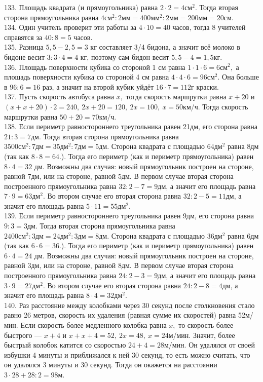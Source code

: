 133. Площадь квадрата (и прямоугольника) равна $2\cdot2=4\text{см}^2.$ Тогда вторая сторона прямоугольника равна $4\text{см}^2:2\text{мм}=400\text{мм}^2:2\text{мм}=
200\text{мм}=20$см.\\
134. Один учитель проверит эти работы за $4\cdot10=40$ часов, тогда 8 учителей справятся за $40:8=5$ часов.\\
135. Разница $5,5-2,5=3$ кг составляет 3/4 бидона, а значит всё молоко в бидоне весит $3:3\cdot4=4$ кг, поэтому сам бидон весит $5,5-4=1,5$кг.\\
136. Площадь поверхности кубика со стороной 1 см равна $1\cdot1\cdot6=6\text{см}^2,$ а площадь поверхности кубика со стороной 4 см равна $4\cdot4\cdot6=96\text{см}^2.$ Она больше в $96:6=16$ раз, а значит на второй кубик уйдёт $16\cdot7=112$г краски.\\
137. Пусть скорость автобуса равна $x,$ тогда скорость маршрутки равна $x+20$ и $(x+x+20)\cdot2=240,\ 2x+20=120,\ 2x=100,\ x=50$км/ч. Тогда скорость маршрутки равна $50+20=70$км/ч.\\
138. Если периметр равностороннего треугольника равен 21дм, его сторона равна $21:3=7\text{дм}.$ Тогда вторая сторона прямоугольника равна $3500\text{см}^2:7\text{дм}=35\text{дм}^2:7\text{дм}=5\text{дм}$. Сторона квадрата с площадью $64\text{дм}^2$ равна 8дм (так как $8\cdot8=64.$). Тогда его периметр (как и периметр прямоугольника) равен $8\cdot4=32$ дм. Возможны два случая: новый прямоугольник построен на стороне, равной 7дм, или на стороне, равной 5дм. В первом случае вторая сторона построенного прямоугольника равна $32:2-7=9$дм, а значит его площадь равна $7\cdot9=63\text{дм}^2.$ Во втором случае его вторая сторона равна $32:2-5=11$дм, а значит его площадь равна $5\cdot11=55\text{дм}^2.$\\
139. Если периметр равностороннего треугольника равен 9дм, его сторона равна $9:3=3\text{дм}.$ Тогда вторая сторона прямоугольника равна $2400\text{см}^2:3\text{дм}=24\text{дм}^2:3\text{дм}=8\text{дм}$. Сторона квадрата с площадью $36\text{дм}^2$ равна 6дм (так как $6\cdot6=36.$). Тогда его периметр (как и периметр прямоугольника) равен $6\cdot4=24$ дм. Возможны два случая: новый прямоугольник построен на стороне, равной 3дм, или на стороне, равной 8дм. В первом случае вторая сторона построенного прямоугольника равна $24:2-3=9$дм, а значит его площадь равна $3\cdot9=27\text{дм}^2.$ Во втором случае его вторая сторона равна $24:2-8=4$дм, а значит его площадь равна $8\cdot4=32\text{дм}^2.$\\
140. Раз расстояние между колобками через 30 секунд после столкновения стало равно 26 метров, скорость их удаления (равная сумме их скоростей) равна 52м/мин. Если скорость более медленного колобка равна $x,$ то скорость более быстрого --- $x+4$ и $x+x+4=52,\ 2x=48,\ x=24$м/мин. Значит, более быстрый колобок катится со скоростью $24+4=28$м/мин. Он удалялся от своей избушки 4 минуты и приближался к ней 30 секунд, то есть можно считать, что он удалялся 3 минуты и 30 секунд. Тогда он окажется на расстоянии $3\cdot28+28:2=98$м.\\
